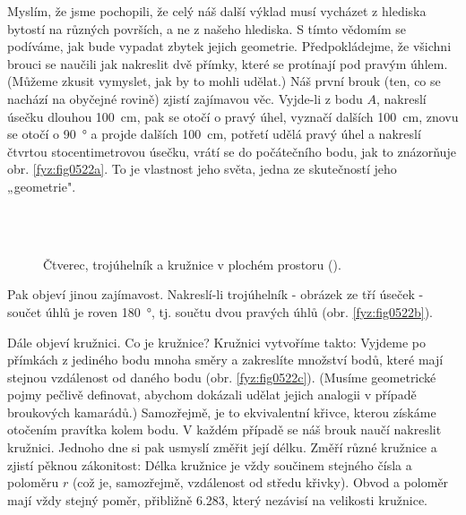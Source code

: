     Myslím, že jsme pochopili, že celý náš další výklad musí vycházet z hlediska bytostí na různých 
    površích, a ne z našeho hlediska. S tímto vědomím se podíváme, jak bude vypadat zbytek jejich 
    geometrie. Předpokládejme, že všichni brouci se naučili jak nakreslit dvě přímky, které se 
    protínají pod pravým úhlem. (Můžeme zkusit vymyslet, jak by to mohli udělat.) Náš první brouk 
    (ten, co se nachází na obyčejné rovině) zjistí zajímavou věc. Vyjde-li z bodu \(A\), nakreslí 
    úsečku dlouhou \qty{100}{\cm}, pak se otočí o pravý úhel, vyznačí dalších \qty{100}{\cm}, znovu 
    se otočí o \qty{90}{\degree} a projde dalších \qty{100}{\cm}, potřetí udělá pravý úhel a nakreslí 
    čtvrtou stocentimetrovou úsečku, vrátí se do počátečního bodu, jak to znázorňuje obr. 
    \ref{fyz:fig0522a}. To je vlastnost jeho světa, jedna ze skutečností jeho „geometrie".
    
    \begin{figure}[ht!] %
      \centering  
          \\
          \\
      \caption{Čtverec, trojúhelník a kružnice v plochém prostoru (\cite[s.~777]{Feynman02}).}
      \label{fyz:fig0522}
    \end{figure}     
    
    Pak objeví jinou zajímavost. Nakreslí-li trojúhelník - obrázek ze tří úseček - součet úhlů je 
    roven \qty{180}{\degree}, tj. součtu dvou pravých úhlů (obr. \ref{fyz:fig0522b}).
    
    Dále objeví kružnici. Co je kružnice? Kružnici vytvoříme takto: Vyjdeme po přímkách z jediného 
    bodu mnoha směry a zakreslíte množství bodů, které mají stejnou vzdálenost od daného bodu (obr. 
    \ref{fyz:fig0522c}). (Musíme geometrické pojmy pečlivě definovat, abychom dokázali udělat jejich 
    analogii v případě broukových kamarádů.) Samozřejmě, je to ekvivalentní křivce, kterou získáme 
    otočením pravítka kolem bodu. V každém případě se náš brouk naučí nakreslit kružnici. Jednoho 
    dne si pak usmyslí změřit její délku. Změří různé kružnice a zjistí pěknou zákonitost: Délka 
    kružnice je vždy součinem stejného čísla a poloměru \(r\) (což je, samozřejmě, vzdálenost od 
    středu křivky). Obvod a poloměr mají vždy stejný poměr, přibližně \num{6.283}, který nezávisí 
    na velikosti kružnice.

